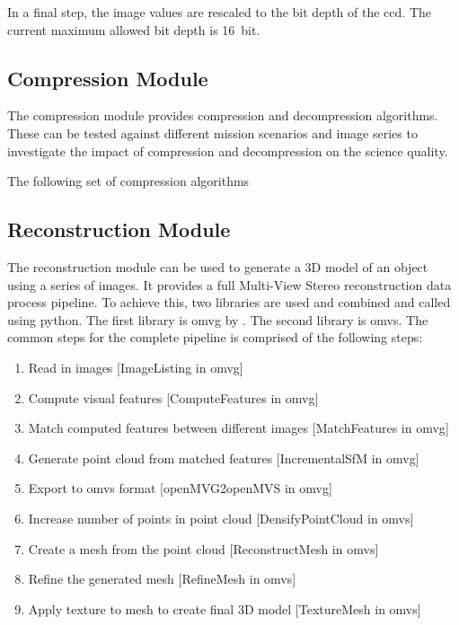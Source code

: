 In a final step, the image values are rescaled to the bit depth of the \gls{ccd}. The current maximum allowed bit depth is \SI{16}{bit}.

\subsection{Compression Module}
The compression module provides compression and decompression algorithms. These can be tested against different mission scenarios and image series to investigate the impact of compression and decompression on the science quality.

The following set of compression algorithms 

\subsection{Reconstruction Module}
The reconstruction module can be used to generate a 3D model of an object using a series of images. It provides a full Multi-View Stereo reconstruction data process pipeline. To achieve this, two libraries are used and combined and called using python. The first library is \gls{omvg} by \cite{openMVG}. The second library is \gls{omvs}. 
The common steps for the complete pipeline is comprised of the following steps:
\begin{enumerate}
    \item Read in images [ImageListing in \gls{omvg}]
    \item Compute visual features [ComputeFeatures in \gls{omvg}]
    \item Match computed features between different images [MatchFeatures in \gls{omvg}]
    \item Generate point cloud from matched features [IncrementalSfM in \gls{omvg}]
    \item Export to \gls{omvs} format [openMVG2openMVS in \gls{omvg}]
    \item Increase number of points in point cloud [DensifyPointCloud in \gls{omvs}]
    \item Create a mesh from the point cloud [ReconstructMesh in \gls{omvs}]
    \item Refine the generated mesh [RefineMesh in \gls{omvs}]
    \item Apply texture to mesh to create final 3D model [TextureMesh in \gls{omvs}]
\end{enumerate}

